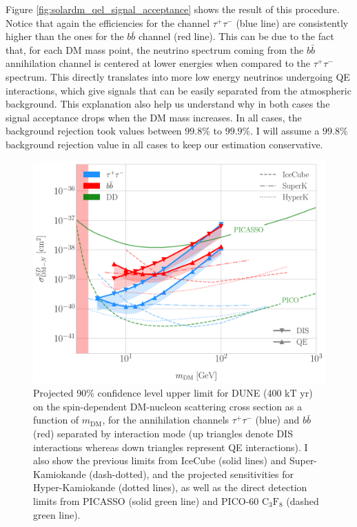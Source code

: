 Figure \ref{fig:solardm_qel_signal_acceptance} shows the result of this procedure. Notice that again the efficiencies for the  channel $\tau^{+}\tau^{-}$ (blue line) are consistently higher than the ones for the $b\bar{b}$ channel (red line). This can be due to the fact that, for each DM mass point, the neutrino spectrum coming from the $b\bar{b}$ annihilation channel is centered at lower energies when compared to the $\tau^{+}\tau^{-}$ spectrum. This directly translates into more low energy neutrinos undergoing QE interactions, which give signals that can be easily separated from the atmospheric background. This explanation also help us understand why in both cases the signal acceptance drops when the DM mass increases. In all cases, the background rejection took values between $99.8\%$ to $99.9\%$. I will assume a $99.8\%$ background rejection value in all cases to keep our estimation conservative.

\begin{figure}[t]
	\centering
	\includegraphics[width=0.95\linewidth]{Images/DM_Analysis/solardm_xsection_sd.pdf}
	\caption[Projected 90\% confidence level upper limit for DUNE (400 kT yr) on the spin-dependent DM-nucleon scattering cross section as a function of $m_{\mathrm{DM}}$, for the annihilation channels $\tau^{+}\tau^{-}$ and $b\bar{b}$ separated by interaction mode]{Projected 90\% confidence level upper limit for DUNE (400 kT yr) on the spin-dependent DM-nucleon scattering cross section as a function of $m_{\mathrm{DM}}$, for the annihilation channels $\tau^{+}\tau^{-}$ (blue) and $b\bar{b}$ (red) separated by interaction mode (up triangles denote DIS interactions whereas down triangles represent QE interactions). I also show the previous limits from IceCube \cite{IceCube2021} (solid lines) and Super-Kamiokande (dash-dotted), and the projected sensitivities for Hyper-Kamiokande \cite{Bell2021} (dotted lines), as well as the direct detection limits from PICASSO \cite{Behnke2016} (solid green line) and PICO-60 $\mathrm{C}_{3}\mathrm{F}_{8}$ \cite{PICO2019} (dashed green line).}
	\label{fig:solardm_xsection_sd}
\end{figure}

